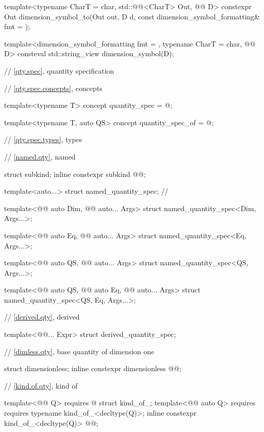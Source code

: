 \begin{codeblock}
{template<typename CharT = char, std::@@<CharT> Out, @@ D>
constexpr Out dimension_symbol_to(Out out, D d, const dimension_symbol_formatting& fmt = {});

template<dimension_symbol_formatting fmt = {}, typename CharT = char, @@ D>
consteval std::string_view dimension_symbol(D);

// \ref{qty.spec}, quantity specification

// \ref{qty.spec.concepts}, concepts

template<typename T>
concept quantity_spec = @\seebelownc@;

template<typename T, auto QS>
concept quantity_spec_of = @\seebelownc@;

// \ref{qty.spec.types}, types

// \ref{named.qty}, named

struct subkind;
inline constexpr subkind @@{};

template<auto...>
struct named_quantity_spec;  // \notdef

template<@@ auto Dim, @@ auto... Args>
struct named_quantity_spec<Dim, Args...>;

template<@@ auto Eq, @@ auto... Args>
struct named_quantity_spec<Eq, Args...>;

template<@@ auto QS, @@ auto... Args>
struct named_quantity_spec<QS, Args...>;

template<@@ auto QS, @@ auto Eq, @@ auto... Args>
struct named_quantity_spec<QS, Eq, Args...>;

// \ref{derived.qty}, derived

template<@@... Expr>
struct derived_quantity_spec;

// \ref{dimless.qty}, base quantity of dimension one

struct dimensionless;
inline constexpr dimensionless @@{};

// \ref{kind.of.qty}, kind of

template<@@ Q>
  requires @\seebelownc@
struct kind_of_;
template<@@ auto Q>
  requires requires { typename kind_of_<decltype(Q)>; }
inline constexpr kind_of_<decltype(Q)> @@{};

}
\end{codeblock}
